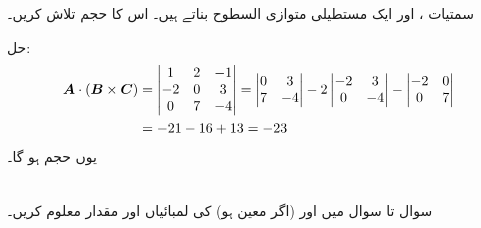 سمتیات ،  اور  ایک مستطیلی متوازی السطوح بناتے ہیں۔ اس کا حجم تلاش کریں۔

حل:\quad
\begin{align*}
{\ensuremath{{\boldsymbol{A}}}}\cdot({{\boldsymbol{B}}}\times{\ensuremath{{\boldsymbol{C}}}})&=\begin{vmatrix}1&2&-1\\-2&0&3\\0&7&-4\end{vmatrix}=
\begin{vmatrix}0&3\\7&-4\end{vmatrix}-2\begin{vmatrix}-2&3\\0&-4\end{vmatrix}-\begin{vmatrix}-2&0\\0&7\end{vmatrix}\\
&=-21-16+13=-23
\end{align*}
یوں حجم  ہو گا۔

\\
سوال  تا سوال  میں   اور  (اگر معین ہو) کی لمبائیاں اور مقدار معلوم کریں۔ 

